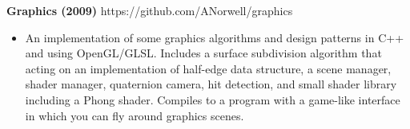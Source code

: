 \documentclass[line,margin]{res}
\begin{document}
\begin{resume}
{\bf Graphics (2009)} \hfill https://github.com/ANorwell/graphics
                 \begin{itemize}  \itemsep -2pt %
                 \item An implementation of some graphics algorithms and design patterns in C++ and using OpenGL/GLSL. Includes a surface subdivision algorithm that acting on an implementation of half-edge data structure, a scene manager, shader manager, quaternion camera, hit detection, and small shader library including a Phong shader. Compiles to a program with a game-like interface in which you can fly around graphics scenes.
                \end{itemize}
  



\end{resume}
\end{document}
